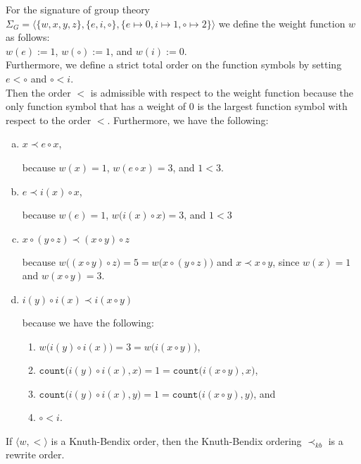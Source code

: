 \example
For the signature of group theory
$\Sigma_G = \bigl\langle \{ w, x, y, z \}, \{ e, i, \circ \}, \{ e \mapsto 0, i \mapsto 1, \circ \mapsto 2 \}\bigr\rangle$
we define the weight function $w$ as follows:
\\[0.2cm]
\hspace*{1.3cm}
$w(e) := 1$, \quad $w(\circ) := 1$, \quad and \quad $w(i) := 0$.
\\[0.2cm]
Furthermore, we define a strict total order on the function symbols by setting
\\[0.2cm]
\hspace*{1.3cm}
$e < \circ$ \quad and \quad $\circ < i$.
\\[0.2cm]
Then the order $<$ is admissible with respect to the weight function because the only function symbol that has
a weight of $0$ is the largest function symbol with respect to the order $<$.
Furthermore, we have the following:
\begin{enumerate}[(a)]
\item $x \prec e \circ x$,

      because $w(x) = 1$, $w(e \circ x) = 3$, and $1 < 3$.
\item $e \prec i(x) \circ x$,

      because $w(e) = 1$, $w\bigl(i(x) \circ x\bigr) = 3$, and $1 < 3$
\item $x \circ (y \circ z) \prec (x \circ y) \circ z$

      because $w\bigl((x \circ y) \circ z\bigr) = 5 = w\bigl(x \circ (y \circ z)\bigr)$ and
      $x \prec x \circ y$, since $w(x) = 1$ and $w(x \circ y) = 3$.  
\item $i(y) \circ i(x) \prec i(x \circ y)$

      because we have the following:
      \begin{enumerate}
      \item $w\bigl(i(y) \circ i(x)\bigr) = 3 = w\bigl(i(x \circ y)\bigr)$, 
      \item $\mathtt{count}\bigl(i(y) \circ i(x), x\bigr) = 1 = \mathtt{count}\bigl(i(x \circ y), x\bigr)$, 
      \item $\mathtt{count}\bigl(i(y) \circ i(x), y\bigr) = 1 = \mathtt{count}\bigl(i(x \circ y), y\bigr)$, \quad and
      \item $\circ < i$. \eoxs
      \end{enumerate}
\end{enumerate}


\begin{Theorem}
  If $\langle w, < \rangle$ is a Knuth-Bendix order, then the Knuth-Bendix ordering $\prec_{kb}$ is a rewrite order.
\end{Theorem}

